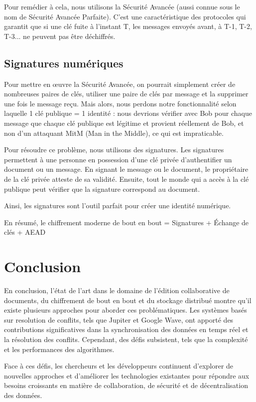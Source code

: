 Pour remédier à cela, nous utilisons la Sécurité Avancée (aussi connue sous le nom de Sécurité Avancée Parfaite). C'est une caractéristique des protocoles qui garantit que si une clé fuite à l'instant T, les messages envoyés avant, à T-1, T-2, T-3... ne peuvent pas être déchiffrés.

\subsection{Signatures numériques}

Pour mettre en œuvre la Sécurité Avancée, on pourrait simplement créer de nombreuses paires de clés, utiliser une paire de clés par message et la supprimer une fois le message reçu. Mais alors, nous perdons notre fonctionnalité selon laquelle 1 clé publique = 1 identité : nous devrions vérifier avec Bob pour chaque message que chaque clé publique est légitime et provient réellement de Bob, et non d'un attaquant MitM (Man in the Middle), ce qui est impraticable.

Pour résoudre ce problème, nous utilisons des signatures. Les signatures permettent à une personne en possession d'une clé privée d'authentifier un document ou un message. En signant le message ou le document, le propriétaire de la clé privée atteste de sa validité. Ensuite, tout le monde qui a accès à la clé publique peut vérifier que la signature correspond au document.

Ainsi, les signatures sont l'outil parfait pour créer une identité numérique.

En résumé, le chiffrement moderne de bout en bout = Signatures + Échange de clés + AEAD

\section{Conclusion}
En conclusion, l'état de l'art dans le domaine de l'édition collaborative de
documents, du chiffrement de bout en bout et du stockage distribué montre qu'il
existe plusieurs approches pour aborder ces problématiques. Les systèmes basés
sur resolution de conflits, tels que Jupiter et Google Wave, ont apporté des
contributions significatives dans la synchronisation des données en temps réel
et la résolution des conflits. Cependant, des défis subsistent, tels que la
complexité et les performances des algorithmes.

Face à ces défis, les chercheurs et les développeurs continuent d'explorer de nouvelles approches et d'améliorer les technologies existantes pour répondre aux besoins croissants en matière de collaboration, de sécurité et de décentralisation des données.